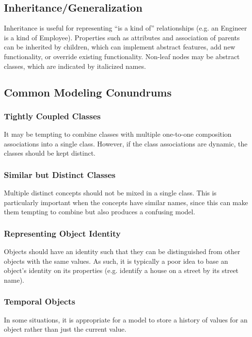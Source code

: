 \documentclass[12pt,titlepage]{article}
\begin{document}
    \subsection{Inheritance/Generalization}
      Inheritance is useful for representing ``is a kind of'' relationships (e.g. an Engineer is a kind of Employee). Properties such as attributes and association of parents can be
      inherited by children, which can implement abstract features, add new functionality, or override existing functionality. Non-leaf nodes may be abstract classes, which are
      indicated by italicized names.

    \subsection{Common Modeling Conundrums}

      \subsubsection{Tightly Coupled Classes}
        It may be tempting to combine classes with multiple one-to-one composition associations into a single class. However, if the class associations are dynamic, the classes should
        be kept distinct.

      \subsubsection{Similar but Distinct Classes}
        Multiple distinct concepts should not be mixed in a single class. This is particularly important when the concepts have similar names, since this can make them tempting to
        combine but also produces a confusing model.

      \subsubsection{Representing Object Identity}
        Objects should have an identity such that they can be distinguished from other objects with the same values. As such, it is typically a poor idea to base an object's identity
        on its properties (e.g. identify a house on a street by its street name).

      \subsubsection{Temporal Objects}
        In some situations, it is appropriate for a model to store a history of values for an object rather than just the current value.
\end{document}
